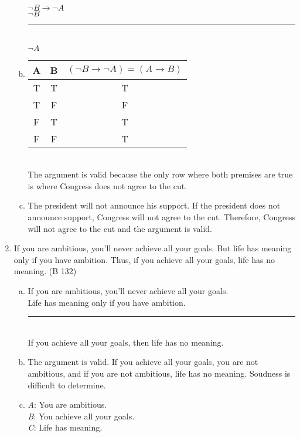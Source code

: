 \documentclass{article}
\begin{document}
\begin{enumerate}
\begin{enumerate}[(a)]
                        $\neg B \to \neg A$\\
                        $\neg B$\\
                        \rule{5em}{.5pt}\\
                        $\neg A$
                  \item \begin{tabular}{c|c|c}
                              A                      & B & $(\neg B \to \neg A) = (A \to B)$ \\
                              \hline
                              \rowcolor{lightgray} T & T & T                                 \\
                              \rowcolor{lightgray} T & F & F                                 \\
                              \rowcolor{lightgray} F & T & T                                 \\
                              F                      & F & T
                        \end{tabular} \\ The argument is valid because the only row where both premises are true is where Congress does not agree to the cut.
                  \item The president will not announce his support. If the president does not announce support, Congress will not agree to the cut. Therefore, Congress will not agree to the cut and the argument is valid.
            \end{enumerate}
      \item If you are ambitious, you'll never achieve all your goals. But life has meaning only if you have ambition. Thus, if you achieve all your goals, life has no meaning. (B 132)
            \begin{enumerate}[(a)]
                  \item If you are ambitious, you'll never achieve all your goals.\\
                        Life has meaning only if you have ambition.\\
                        \rule{15em}{.5pt}\\
                        If you achieve all your goals, then life has no meaning.
                  \item The argument is valid. If you achieve all your goals, you are not ambitious, and if you are not ambitious, life has no meaning. Soudness is difficult to determine.
                  \item \textit{A}: You are ambitious.\\
                        \textit{B}: You achieve all your goals.\\
                        \textit{C}: Life has meaning.\\


\end{enumerate}
\end{enumerate}
\end{document}
